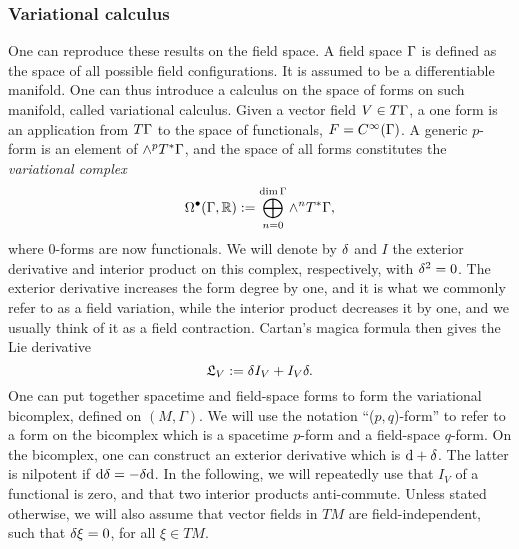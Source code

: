 \subsubsection*{Variational calculus}
One can reproduce these results on the field space. A field space $\Gamma $ is defined as the space of all possible field configurations. It is assumed to be a differentiable manifold. One can thus introduce a calculus on the space of forms on such manifold, called variational calculus. Given a vector field $V\in T\Gamma $, a one form is an application from $T\Gamma $ to the space of functionals, $F=C^\infty (\Gamma )$. A generic $p$-form is an element of $\wedge^pT^*\Gamma $, and the space of all forms constitutes the \textit{variational complex}
\begin{equation}
	\Omega^\bullet(\Gamma ,\mathbb{R}):=\bigoplus_{n=0}^{\dim \Gamma }\wedge^n T^*\Gamma ,
\end{equation}
where $0$-forms are now functionals. We will denote by $\delta$ and $I$ the exterior derivative and interior product on this complex, respectively, with $\delta^2=0$. The exterior derivative increases the form degree by one, and it is what we commonly refer to as a field variation, while the interior product decreases it by one, and we usually think of it as a field contraction. Cartan’s magica formula then gives the Lie derivative
\begin{equation}
	\mathfrak{L}_V:=\delta I_V+I_V\delta .
\end{equation}
One can put together spacetime and field-space forms to form the variational bicomplex, defined on $(M,\Gamma)$. We will use the notation “($p, q$)-form” to refer to a form on the bicomplex which is a spacetime $p$-form and a field-space $q$-form. On the bicomplex, one can construct an exterior derivative which is $\dd +\delta $. The latter is nilpotent if $\dd \delta=-\delta \dd $. In the following, we will repeatedly use that $I_V$ of a functional is zero, and that two interior products anti-commute. Unless stated otherwise, we will also assume that vector fields in $TM$ are field-independent, such that $\delta\xi=0$, for all $\xi\in TM$.
 
 
 
 

 
 
 

 
 
 

 
 
 

 
 
 

 
 
 

 
 
 

 
 
 

 
 
 
